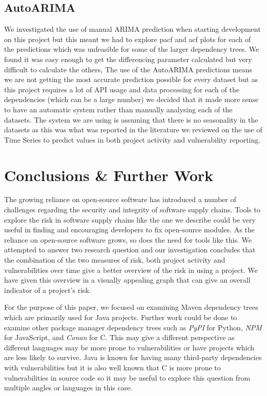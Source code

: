 \documentclass[conference]{IEEEtran}
\begin{document}
\subsection{AutoARIMA}
We investigated the use of manual ARIMA prediction when starting development on this project but this meant we had to explore pacf and acf plots for each of the predictions which was unfeasible for some of the larger dependency trees. We found it was easy enough to get the differencing parameter calculated but very difficult to calculate the others, The use of the AutoARIMA predictions means we are not getting the most accurate prediction possible for every dataset but as this project requires a lot of API usage and data processing for each of the dependencies (which can be a large number) we decided that it made more sense to have an automatic system rather than manually analysing each of the datasets. The system we are using is assuming that there is no seasonality in the datasets as this was what was reported in the literature we reviewed on the use of Time Series to predict values in both project activity and vulnerability reporting. 

\section{Conclusions \& Further Work}
The growing reliance on open-source software has introduced a number of challenges regarding the security and integrity of software supply chains. Tools to explore the risk in software supply chains like the one we describe could be very useful in finding and encouraging developers to fix open-source modules. As the reliance on open-source software grows, so does the need for tools like this. We attempted to answer two research question and our investigation concludes that the combination of the two measures of risk, both project activity and vulnerabilities over time give a better overview of the risk in using a project. We have given this overview in a visually appealing graph that can give an overall indicator of a project's risk. 

For the purpose of this paper, we focused on examining Maven dependency trees which are primarily used for Java projects. Further work could be done to examine other package manager dependency trees such as \textit{PyPI} for Python, \textit{NPM} for JavaScript, and \textit{Conan} for C. This may give a different perspective as different languages may be more prone to vulnerabilities or have projects which are less likely to survive. Java is known for having many third-party dependencies with vulnerabilities but it is also well known that C is more prone to vulnerabilities in source code so it may be useful to explore this question from multiple angles or languages in this case. 
\end{document}
